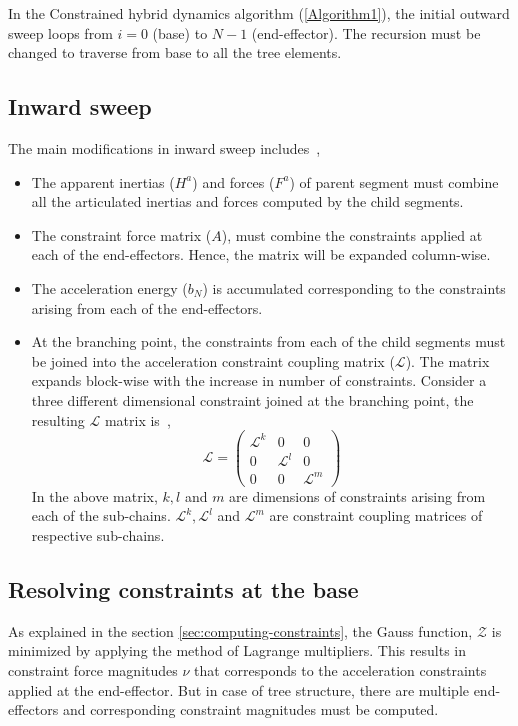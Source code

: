 In the Constrained hybrid dynamics algorithm (\ref{Algorithm1}), the initial outward sweep loops from $i=0$ (base) to $N-1$ (end-effector). The recursion must be changed to traverse from base to all the tree elements.

\subsection{Inward sweep}
The main modifications in inward sweep includes~\cite{shakhimardanov2015composable},
\begin{itemize}
	\item The apparent inertias ($H^a$) and forces ($F^a$) of parent segment must combine all the articulated inertias and forces computed by the child segments.
	\item The constraint force matrix ($A$), must combine the constraints applied at each of the end-effectors. Hence, the matrix will be expanded column-wise.
	\item The acceleration energy ($b_N$) is accumulated corresponding to the constraints arising from each of the end-effectors. 
	\item At the branching point, the constraints from each of the child segments must be joined into the acceleration constraint coupling matrix ($\mathcal{L}$). The matrix expands block-wise with the increase in number of constraints. Consider a three different dimensional constraint joined at the branching point, the resulting $\mathcal{L}$ matrix is~\cite{shakhimardanov2015composable},
	\begin{equation}
		\label{eq:L-matrix}
		\mathcal{L} = \begin{pmatrix}
		\mathcal{L}^k & 0 & 0\\
		0 & \mathcal{L}^l & 0\\
		0 & 0 & \mathcal{L}^m 
		\end{pmatrix}
	\end{equation} 
	In the above matrix, $k, l$ and $m$ are dimensions of constraints arising from each of the sub-chains. $\mathcal{L}^k, \mathcal{L}^l$ and $\mathcal{L}^m$ are constraint coupling matrices of respective sub-chains. 
\end{itemize}

\subsection{Resolving constraints at the base}

As explained in the section \ref{sec:computing-constraints}, the Gauss function, $\mathcal{Z}$ is minimized by applying the method of Lagrange multipliers. This results in constraint force magnitudes $\nu$ that corresponds to the acceleration constraints applied at the end-effector. But in case of tree structure, there are multiple end-effectors and corresponding constraint magnitudes must be computed. 


